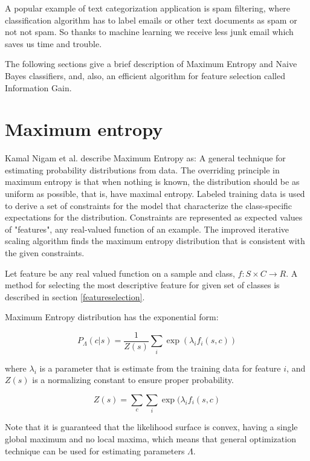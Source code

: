 \documentclass{report}
\begin{document}
A popular example of text categorization application is spam filtering, where classification algorithm has to label emails or other text documents as spam or not not spam. So thanks to machine learning we receive less junk email which saves us time and trouble.

The following sections give a brief description of Maximum Entropy and Naive Bayes classifiers, and, also, an efficient algorithm for feature selection called Information Gain.

\section{Maximum entropy}

Kamal Nigam et al. describe Maximum Entropy as: A general technique for estimating probability distributions from data. The overriding principle in maximum entropy is that when nothing is known, the distribution should be as uniform as possible, that is, have maximal entropy. Labeled training data is used to derive a set of constraints for the model that characterize the class-specific expectations for the distribution. Constraints are represented as expected values of "features", any real-valued function of an example. The improved iterative scaling algorithm finds the maximum entropy distribution that is consistent with the given constraints.\cite{oai:CiteSeerPSU:93050}

Let feature be any real valued function on a sample and class, $f : S \times C \rightarrow R$. A method for selecting the most descriptive feature for given set of classes is described in section \ref{featureselection}.

Maximum Entropy distribution has the exponential form:

\begin{equation}
\label{mx:expdistr}
P_{\Lambda}(c|s) = \frac{1}{Z(s)} \sum_{i}\exp(\lambda_i f_i(s,c))
\end{equation}

where $\lambda_i$ is a parameter that is estimate from the training data for feature $i$, and $Z(s)$ is a normalizing constant to ensure proper probability. 

\[
Z(s) = \sum_c \sum_i \exp(\lambda_i f_i(s,c)
\]

Note that it is guaranteed that the likelihood surface is convex, having a single global maximum and no local maxima, which means that general optimization technique can be used for estimating parameters $\Lambda$\cite{berger:gental}.
\end{document}
